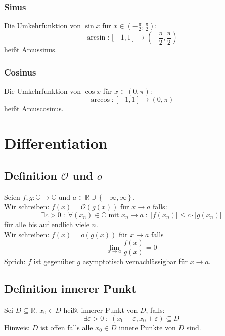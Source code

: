 \documentclass[halfparscip]{scrartcl}
\newcounter{subsection2}
\begin{document}
\subsubsection*{Sinus}
Die Umkehrfunktion von $\sin x$ für $x \in \left(-\frac{\pi}{2},\frac{\pi}{2}\right)$:
\begin{equation*}
\arcsin : \left[-1,1\right] \rightarrow \left(-\frac{\pi}{2},\frac{\pi}{2}\right)
\end{equation*}
heißt Arcussinus.
\subsubsection*{Cosinus}
Die Umkehrfunktion von $\cos x$ für $x \in \left(0,\pi\right)$:
\begin{equation*}
\arccos : \left[-1,1\right] \rightarrow \left(0,\pi\right)
\end{equation*}
heißt Arcuscosinus.\\

\newpage
\section{Differentiation}
\subsection{Definition $\mathcal{O}$ und $o$}
Seien $f,g : \mathbb{C} \rightarrow \mathbb{C}$ und $a \in \mathbb{R} \cup \left\{-\infty, \infty\right\}$.\\
Wir schreiben: $f(x) = \mathcal{O}(g(x))$ für $x \rightarrow a$ falls:
\begin{equation*}
	\exists c > 0 \;:\; \forall (x_n) \in \mathbb{C} \text{ mit } x_n \rightarrow a \;:\; \left|f(x_n)\right| \leq c \cdot \left|g(x_n)\right|
\end{equation*}
für \underline{alle bis auf endlich viele $n$}.\\
Wir schreiben: $f(x) = o(g(x))$ für $x \rightarrow a$ falls
\begin{equation*}
	\lim_{x\rightarrow a}\frac{f(x)}{g(x)} = 0
\end{equation*}
Sprich: \glqq{}$f$ ist gegenüber $g$ asymptotisch vernachlässigbar für $x \rightarrow a$.\grqq

\subsection{Definition innerer Punkt}
Sei $D \subseteq \mathbb{R}$. $x_0 \in D$ heißt innerer Punkt von $D$, falls:
\begin{equation*}
	\exists \varepsilon > 0 \;:\; (x_0 - \varepsilon, x_0 + \varepsilon) \subseteq D
\end{equation*}
Hinweis: $D$ ist offen falls alle $x_0 \in D$ innere Punkte von $D$ sind.
\end{document}
